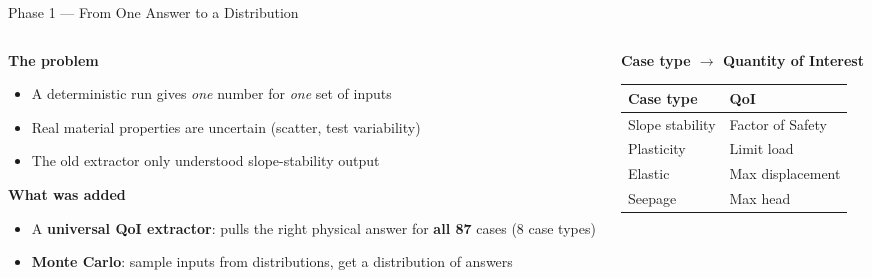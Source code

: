 \documentclass[aspectratio=169]{beamer}
\begin{document}

\begin{frame}[shrink=15]{Phase 1 --- From One Answer to a Distribution}
    \begin{columns}[t]
        \begin{column}{0.52\textwidth}
            \textbf{The problem}
            \begin{itemize}
                \setlength\itemsep{0.3em}
                \item A deterministic run gives \emph{one} number for \emph{one} set of inputs
                \item Real material properties are uncertain (scatter, test variability)
                \item The old extractor only understood slope-stability output
            \end{itemize}
            \vspace{0.25cm}
            \textbf{What was added}
            \begin{itemize}
                \setlength\itemsep{0.3em}
                \item[\textcolor{tugreen}{\ding{51}}] A \textbf{universal QoI extractor}: pulls the right physical answer for \textbf{all 87} cases (8 case types)
                \item[\textcolor{tugreen}{\ding{51}}] \textbf{Monte Carlo}: sample inputs from distributions, get a distribution of answers
            \end{itemize}
        \end{column}
        \begin{column}{0.46\textwidth}
            \textbf{Case type $\to$ Quantity of Interest}
            \begin{center}
            \scriptsize
            \begin{tabular}{ll}
                \toprule
                Case type & QoI \\
                \midrule
                Slope stability     & Factor of Safety \\
                Plasticity          & Limit load \\
                Elastic             & Max displacement \\
                Seepage             & Max head \\

\end{tabular}
\end{center}
\end{column}
\end{columns}
\end{frame}
\end{document}
